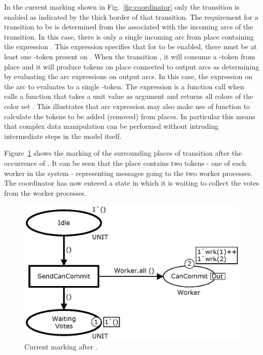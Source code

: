 
In the current marking shown in Fig.~\ref{fig:coordinator} only the
transition  is enabled as indicated by the
thick border of that transition. The requirement for a transition to
be  is determined from the 
associated with the incoming arcs of the transition. In this case,
there is only a single incoming arc from place 
containing the expression \smlcode{()}. This expression specifies that
for  to be enabled, there must be at least one
\smlcode{()}-token present on . When the
 transition , it will consume a
\smlcode{()}-token from place  and it will produce
tokens on place connected to output arcs as determining by evaluating
the arc expressions on output arcs. In this case, the expression
\smlcode{()} on the arc to  evaluates to a
single \smlcode{()}-token. The expression  is a
function call when calls a function  that takes a
unit value as argument and returns all colors of the color set
. This illustrates that arc expression may also make
use of function to calculate the tokens to be added (removed) from
places. In particular this means that complex data manipulation can be
performed without intruding intermediate steps in the model itself.

Figure~\ref{fig:sendcancommit} shows the marking of the surrounding
places of transition  after the occurrence of
. It can be seen that the place
 contains two tokens - one of each worker in the
system - representing messages going to the two worker processes. The
coordinator has now entered a state in which it is waiting to collect
the votes from the worker processes.

\begin{figure}[h]
\centering
\includegraphics[scale=.5]{figures/SendCanCommit.eps}
\caption{Current marking after .}
\label{fig:sendcancommit}
\end{figure}

